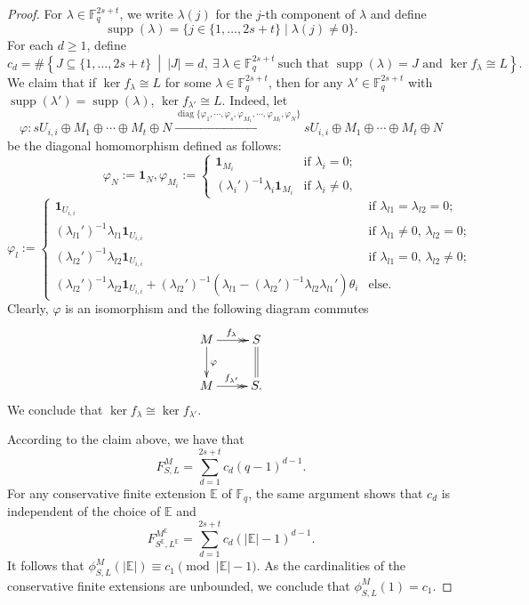 \documentclass[12pt]{amsart}
\theoremstyle{remark}
\theoremstyle{definition}
\numberwithin{equation}{section}
\begin{document}
\begin{proof}
For $\lambda\in \mathbb{F}_q^{2s+t}$,
we write $\lambda(j)$ for the $j$-th component of $\lambda$ and define
\[
\operatorname{supp}(\lambda)=\{j\in \{1,\ldots, 2s+t\}\mid \lambda(j)\neq 0\}.
\]
For each $d\geq 1$, define
\[
c_d
=
\#\left\{
J\subseteq\{1,\dots,2s+t\}
\ \middle|\
|J|=d,\ \exists \ \lambda\in \mathbb{F}_q^{2s+t} \
\text{such that $\operatorname{supp}(\lambda)=J$ and $\ker f_\lambda\cong L$}
\right\}.
\]
We claim that if $\ker f_\lambda\cong L$ for some $\lambda\in \mathbb{F}_q^{2s+t}$, then for any $\lambda'\in \mathbb{F}_q^{2s+t}$ with $\operatorname{supp}(\lambda')=\operatorname{supp}(\lambda)$, $\ker f_{\lambda'}\cong L$. Indeed, let \[\varphi:sU_{i,i}\oplus M_1\oplus \cdots \oplus M_t\oplus N\xrightarrow{\operatorname{diag}\{
    \varphi_1, \cdots, \varphi_s, \varphi_{M_1},\cdots, \varphi_{M_t}, \varphi_N\}} sU_{i,i}\oplus M_1\oplus \cdots \oplus M_t\oplus N\]  be the diagonal homomorphism defined as follows:
\[
\varphi_N:=\mathbf{1}_N, \varphi_{M_i}:=\begin{cases}
    \mathbf{1}_{M_i}& \text{if $\lambda_i=0$};\\
    (\lambda_i')^{-1}\lambda_i\mathbf{1}_{M_i} &\text{if $\lambda_i\neq 0$}, 
\end{cases}
\]
\[
\varphi_l:=\begin{cases}
        \mathbf{1}_{U_{i,i}}&\text{if $\lambda_{l1}=\lambda_{l2}=0$};\\
        (\lambda_{l1}')^{-1}\lambda_{l1}\mathbf{1}_{U_{i,i}}&\text{if $\lambda_{l1}\neq 0$, $\lambda_{l2}=0$};\\
        (\lambda_{l2}')^{-1}\lambda_{l2}\mathbf{1}_{U_{i,i}}&\text{if $\lambda_{l1}= 0$, $\lambda_{l2}\neq 0$};\\
        (\lambda_{l2}')^{-1}\lambda_{l2}\mathbf{1}_{U_{i,i}}+(\lambda_{l2}')^{-1}(\lambda_{l1}-(\lambda_{l2}')^{-1}\lambda_{l2}\lambda_{l1}')\theta_i&\text{else}.
    \end{cases}
\]
Clearly, $\varphi$ is an isomorphism and the following diagram  commutes
\[
\xymatrix{M\ar[d]^{\varphi}\ar@{->>}[r]^{f_\lambda}&S\ar@{=}[d]\\
M\ar@{->>}[r]^{f_{\lambda'}}&S.}
\]
We conclude that $\ker f_\lambda\cong \ker f_{\lambda'}$.

According to the claim above, we have that
\[
F_{S,L}^M=\sum_{d=1}^{2s+t}c_d(q-1)^{d-1}.
\]
For any conservative finite extension $\mathbb{E}$ of $\mathbb{F}_q$, the same argument shows that $c_d$ is independent of the choice of $\mathbb{E}$ and
\[
F_{S^{\mathbb{E}},L^\mathbb{E}}^{M^{\mathbb{E}}}=\sum_{d=1}^{2s+t}c_d(|\mathbb{E}|-1)^{d-1}.
\]
It follows that $\phi_{S,L}^M(|\mathbb{E}|)\equiv c_1 \pmod{|\mathbb{E}|-1}$. As the cardinalities of the conservative finite extensions are unbounded,  we conclude that $\phi_{S,L}^M(1)=c_1$.


\end{proof}
\end{document}
